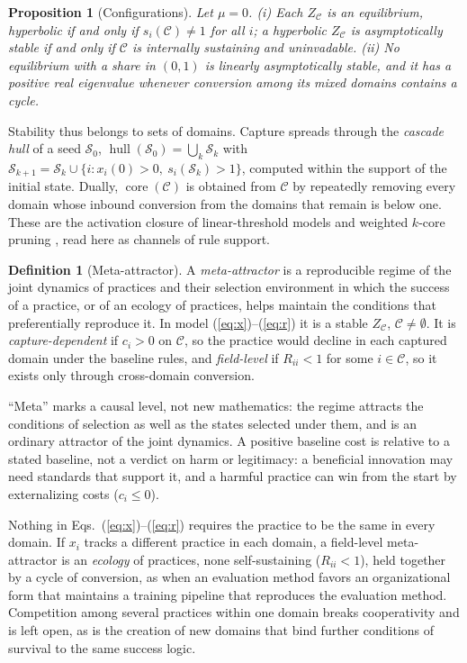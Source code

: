 \documentclass[letterpaper]{article} %
\newtheorem{proposition}{Proposition}
\theoremstyle{definition}
\newtheorem{definition}{Definition}
\newcommand{\hull}{\operatorname{hull}}
\newcommand{\core}{\operatorname{core}}
\newcommand{\cC}{\mathcal{C}}
\newcommand{\cS}{\mathcal{S}}
\begin{document}
\begin{proposition}[Configurations]\label{prop:config}
Let $\mu=0$. (i) Each $Z_\cC$ is an equilibrium, hyperbolic if and only if $s_i(\cC)\neq1$ for all $i$; a hyperbolic $Z_\cC$ is asymptotically stable if and only if $\cC$ is internally sustaining and uninvadable. (ii) No equilibrium with a share in $(0,1)$ is linearly asymptotically stable, and it has a positive real eigenvalue whenever conversion among its mixed domains contains a cycle.
\end{proposition}

Stability thus belongs to sets of domains. Capture spreads through the \emph{cascade hull} of a seed $\cS_0$, $\hull(\cS_0)=\bigcup_k\cS_k$ with $\cS_{k+1}=\cS_k\cup\{i:x_i(0)>0,\ s_i(\cS_k)>1\}$, computed within the support of the initial state. Dually, $\core(\cC)$ is obtained from $\cC$ by repeatedly removing every domain whose inbound conversion from the domains that remain is below one. These are the activation closure of linear-threshold models and weighted $k$-core pruning \citep{kempe2003,morris2000,seidman1983}, read here as channels of rule support.

\begin{definition}[Meta-attractor]\label{def:meta}
A \emph{meta-attractor} is a reproducible regime of the joint dynamics of practices and their selection environment in which the success of a practice, or of an ecology of practices, helps maintain the conditions that preferentially reproduce it. In model (\ref{eq:x})--(\ref{eq:r}) it is a stable $Z_\cC$, $\cC\neq\emptyset$. It is \emph{capture-dependent} if $c_i>0$ on $\cC$, so the practice would decline in each captured domain under the baseline rules, and \emph{field-level} if $R_{ii}<1$ for some $i\in\cC$, so it exists only through cross-domain conversion.
\end{definition}

``Meta'' marks a causal level, not new mathematics: the regime attracts the conditions of selection as well as the states selected under them, and is an ordinary attractor of the joint dynamics. A positive baseline cost is relative to a stated baseline, not a verdict on harm or legitimacy: a beneficial innovation may need standards that support it, and a harmful practice can win from the start by externalizing costs ($c_i\le0$).

Nothing in Eqs.~(\ref{eq:x})--(\ref{eq:r}) requires the practice to be the same in every domain. If $x_i$ tracks a different practice in each domain, a field-level meta-attractor is an \emph{ecology} of practices, none self-sustaining ($R_{ii}<1$), held together by a cycle of conversion, as when an evaluation method favors an organizational form that maintains a training pipeline that reproduces the evaluation method. Competition among several practices within one domain breaks cooperativity and is left open, as is the creation of new domains that bind further conditions of survival to the same success logic.
\end{document}
